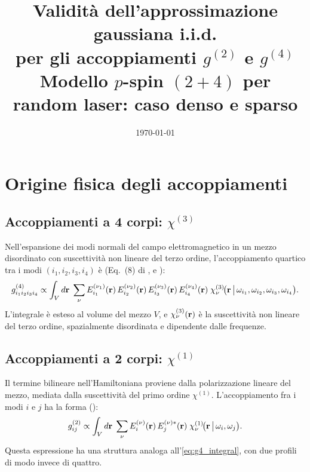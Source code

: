 \documentclass[11pt,a4paper]{article}
\title{%
  Validit\`a dell'approssimazione gaussiana i.i.d. \\[4pt]
  per gli accoppiamenti $g^{(2)}$ e $g^{(4)}$ \\[4pt]
  \large Modello $p$-spin $(2{+}4)$ per random laser:
         caso denso e sparso}
\author{}
\date{\today}
\begin{document}
\maketitle

\section{Origine fisica degli accoppiamenti}\label{sec:origin}

\subsection{Accoppiamenti a 4 corpi: $\chi^{(3)}$}

Nell'espansione dei modi normali del campo elettromagnetico in un mezzo
disordinato con suscettivit\`a non lineare del terzo ordine,
l'accoppiamento quartico tra i modi $(i_1, i_2, i_3, i_4)$ \`e
(Eq.~(8) di \cite{Gradenigo2020}, e \cite{Antenucci2015a}):
\begin{equation}\label{eq:g4_integral}
  g^{(4)}_{i_1 i_2 i_3 i_4}
  \propto
  \int_V d\vb{r}\;
  \sum_{\nu}
    E^{(\nu_1)}_{i_1}(\vb{r})\,
    E^{(\nu_2)}_{i_2}(\vb{r})\,
    E^{(\nu_3)}_{i_3}(\vb{r})\,
    E^{(\nu_4)}_{i_4}(\vb{r})\;
    \chi^{(3)}_{\nu}\!\bigl(\vb{r}\,\big|\,
      \omega_{i_1},\omega_{i_2},\omega_{i_3},\omega_{i_4}\bigr).
\end{equation}
L'integrale \`e esteso al volume del mezzo $V$, e
$\chi^{(3)}_\nu(\vb{r})$ \`e la suscettivit\`a non lineare del terzo
ordine, spazialmente disordinata e dipendente dalle frequenze.

\subsection{Accoppiamenti a 2 corpi: $\chi^{(1)}$}

Il termine bilineare nell'Hamiltoniana proviene dalla polarizzazione
lineare del mezzo, mediata dalla suscettivit\`a del primo ordine
$\chi^{(1)}$. L'accoppiamento fra i modi $i$ e $j$ ha la forma
(\cite{Angelani2006, Leuzzi2009, Antenucci2015a}):
\begin{equation}\label{eq:g2_integral}
  g^{(2)}_{ij}
  \propto
  \int_V d\vb{r}\;
  \sum_\nu
    E^{(\nu)}_i(\vb{r})\,
    E^{(\nu)*}_j(\vb{r})\;
    \chi^{(1)}_\nu\!\bigl(\vb{r}\,\big|\,\omega_i,\omega_j\bigr).
\end{equation}
Questa espressione ha una struttura analoga all'\cref{eq:g4_integral},
con due profili di modo invece di quattro.
\end{document}
